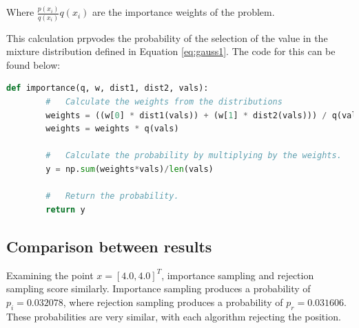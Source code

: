 \documentclass[a4paper, 11pt]{article}
\begin{document}
Where $\frac{p(x_i)}{q(x_i)} q(x_i)$ are the importance weights of the problem. 

This calculation prpvodes the probability of the selection of the value in the mixture distribution defined in Equation \ref*{eq:gauss1}. The code for this can be found below:
\begin{lstlisting}[language=Python, caption=Importance Sampling Code.]
    def importance(q, w, dist1, dist2, vals):
        #   Calculate the weights from the distributions
        weights = ((w[0] * dist1(vals)) + (w[1] * dist2(vals))) / q(vals)
        weights = weights * q(vals)

        #   Calculate the probability by multiplying by the weights.
        y = np.sum(weights*vals)/len(vals)

        #   Return the probability.
        return y
\end{lstlisting}

\subsection{Comparison between results}

Examining the point $x = [4.0, 4.0]^T$, importance sampling and rejection sampling score similarly. Importance sampling produces a probability of $p_i = 0.032078$, where rejection sampling produces a probability of $p_r = 0.031606$. These probabilities are very similar, with each algorithm rejecting the position. 
\pagebreak




\end{document}
